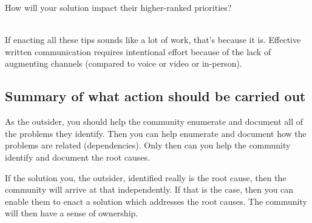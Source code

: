 How will your solution impact their higher-ranked priorities?

\ \\

If enacting all these tips sounds like a lot of work, that's because it is. Effective written communication requires intentional effort because of the lack of augmenting channels (compared to voice or video or in-person). 




\subsection*{Summary of what action should be carried out} 

As the outsider, you should help the community enumerate and document all of the problems they identify. Then you can help enumerate and document how the problems are related (dependencies). Only then can you help the community identify and document the root causes.

If the solution you, the outsider, identified really is the root cause, then the community will arrive at that independently. If that is the case, then you can enable them to enact a solution which addresses the root causes. The community will then have a sense of ownership.
